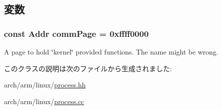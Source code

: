 \subsection{変数}
\hypertarget{classArmLinuxProcess32_adf050b09797e4c45baae408354f3ee1c}{
\subsubsection[{commPage}]{\setlength{\rightskip}{0pt plus 5cm}const {\bf Addr} {\bf commPage} = 0xffff0000}}
\label{classArmLinuxProcess32_adf050b09797e4c45baae408354f3ee1c}


A page to hold \char`\"{}kernel\char`\"{} provided functions. The name might be wrong. 

このクラスの説明は次のファイルから生成されました:\begin{DoxyCompactItemize}
\item 
arch/arm/linux/\hyperlink{arch_2arm_2linux_2process_8hh}{process.hh}\item 
arch/arm/linux/\hyperlink{arch_2arm_2linux_2process_8cc}{process.cc}\end{DoxyCompactItemize}
